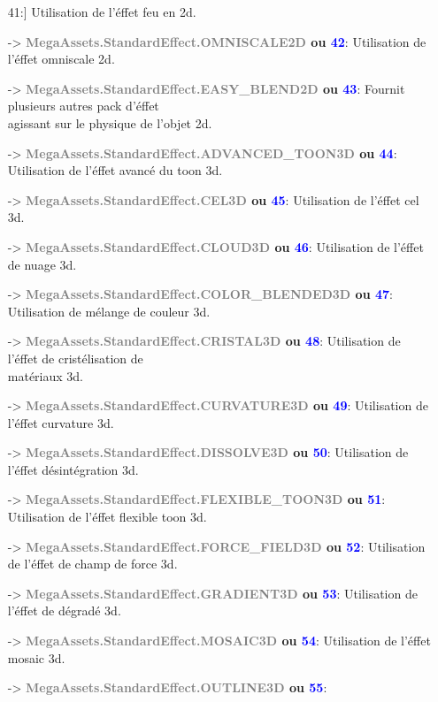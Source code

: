\documentclass[a4paper, 11pt]{article}
\begin{document}
\begin{itemize}
{		{41}}:] Utilisation de l'éffet feu en 2d.
		\item [-> \textbf{\textcolor{gray}{MegaAssets.StandardEffect.OMNISCALE2D} ou \textcolor{blue}{42}}:] 
		Utilisation de l'éffet omniscale 2d.
		\item [-> \textbf{\textcolor{gray}{MegaAssets.StandardEffect.EASY\_BLEND2D} ou \textcolor{blue}
		{43}}:] Fournit plusieurs autres pack d'éffet \\agissant sur le physique de l'objet 2d.
		\item [-> \textbf{\textcolor{gray}{MegaAssets.StandardEffect.ADVANCED\_TOON3D} ou \textcolor{blue}
		{44}}:] Utilisation de l'éffet avancé du toon 3d.
		\item [-> \textbf{\textcolor{gray}{MegaAssets.StandardEffect.CEL3D} ou \textcolor{blue}{45}}:] 
		Utilisation de l'éffet cel 3d.
		\item [-> \textbf{\textcolor{gray}{MegaAssets.StandardEffect.CLOUD3D} ou \textcolor{blue}{46}}:] 
		Utilisation de l'éffet de nuage 3d.
		\item [-> \textbf{\textcolor{gray}{MegaAssets.StandardEffect.COLOR\_BLENDED3D} ou \textcolor{blue}
		{47}}:] Utilisation de mélange de couleur 3d.
		\item [-> \textbf{\textcolor{gray}{MegaAssets.StandardEffect.CRISTAL3D} ou \textcolor{blue}{48}}:] 
		Utilisation de l'éffet de cristélisation de \\matériaux 3d.
		\item [-> \textbf{\textcolor{gray}{MegaAssets.StandardEffect.CURVATURE3D} ou \textcolor{blue}{49}}:] 
		Utilisation de l'éffet curvature 3d.
		\item [-> \textbf{\textcolor{gray}{MegaAssets.StandardEffect.DISSOLVE3D} ou \textcolor{blue}{50}}:] 
		Utilisation de l'éffet désintégration 3d.
		\item [-> \textbf{\textcolor{gray}{MegaAssets.StandardEffect.FLEXIBLE\_TOON3D} ou \textcolor{blue}
		{51}}:] Utilisation de l'éffet flexible toon 3d.
		\item [-> \textbf{\textcolor{gray}{MegaAssets.StandardEffect.FORCE\_FIELD3D} ou \textcolor{blue}
		{52}}:] Utilisation de l'éffet de champ de force 3d.
		\item [-> \textbf{\textcolor{gray}{MegaAssets.StandardEffect.GRADIENT3D} ou \textcolor{blue}{53}}:] 
		Utilisation de l'éffet de dégradé 3d.
		\item [-> \textbf{\textcolor{gray}{MegaAssets.StandardEffect.MOSAIC3D} ou \textcolor{blue}{54}}:] 
		Utilisation de l'éffet mosaic 3d.
		\item [-> \textbf{\textcolor{gray}{MegaAssets.StandardEffect.OUTLINE3D} ou \textcolor{blue}{55}}:] 

\end{itemize}
\end{document}
